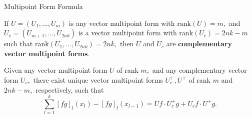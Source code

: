 \documentclass[serif, final, noamsthm]{beamer} %
\begin{document}
\begin{center}
\begin{frame}
\begin{columns}[t]
{%

\begin{block}{Multipoint Form Formula}
\begin{defn}
If $U = (U_1, \ldots, U_m)$ is any vector multipoint form with $\mathrm{rank}(U) = m,$ and $U_c = (U_{m+1}, \ldots, U_{2nk})$ is a vector multipoint form with $\mathrm{rank}(U_c) = 	2nk-m$ such that $\mathrm{rank}(U_{1}, \ldots, U_{2nk}) = 2nk,$ then $U$ and $U_c$ are \textbf{complementary vector multipoint forms}. 
\end{defn}

\begin{thm}\label{P2.BFF-theorem}
Given any vector multipoint form $U$ of rank $m,$ and any complementary vector form $U_c,$ there exist unique vector multipoint forms $U^+_c, U^+$ of rank $m$ and $2nk-m,$ respectively, such that
\begin{equation}\label{P2.BFF-eqn}
\sum_{l=1}^{k} [fg]_l(x_l) - [fg]_l(x_{l-1}) = Uf\cdot U^+_c g + U_c f \cdot U^+ g.
\end{equation}
\end{thm}
\end{block}
}


\end{columns}
\end{frame}
\end{center}
\end{document}
